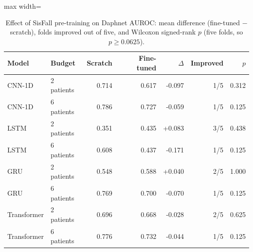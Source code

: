 \begin{table}[ht]
\centering
\small
\caption{Effect of SisFall pre-training on Daphnet AUROC: mean difference (fine-tuned $-$ scratch), folds improved out of five, and Wilcoxon signed-rank $p$ (five folds, so $p\ge0.0625$).}
\label{tab:pretrain}
\begin{adjustbox}{max width=\textwidth}
\begin{tabular}{llrrrrr}
\toprule
Model & Budget & Scratch & Fine-tuned & $\Delta$ & Improved & $p$ \\
\midrule
CNN-1D & 2 patients & 0.714 & 0.617 & -0.097 & 1/5 & 0.312 \\
CNN-1D & 6 patients & 0.786 & 0.727 & -0.059 & 1/5 & 0.125 \\
LSTM & 2 patients & 0.351 & 0.435 & +0.083 & 3/5 & 0.438 \\
LSTM & 6 patients & 0.608 & 0.437 & -0.171 & 1/5 & 0.125 \\
GRU & 2 patients & 0.548 & 0.588 & +0.040 & 2/5 & 1.000 \\
GRU & 6 patients & 0.769 & 0.700 & -0.070 & 1/5 & 0.125 \\
Transformer & 2 patients & 0.696 & 0.668 & -0.028 & 2/5 & 0.625 \\
Transformer & 6 patients & 0.776 & 0.732 & -0.044 & 1/5 & 0.125 \\
\bottomrule
\end{tabular}
\end{adjustbox}
\end{table}